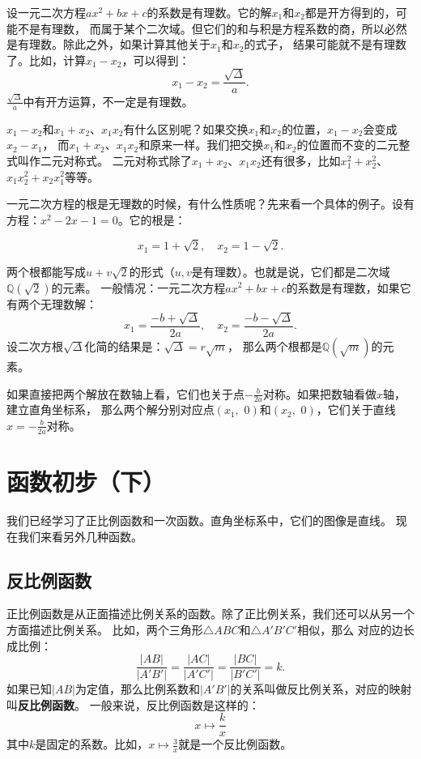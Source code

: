 \documentclass[12pt,UTF8]{ctexbook}
\begin{document}
设一元二次方程$ax^2 + bx + c$的系数是有理数。它的解$x_1$和$x_2$都是开方得到的，可能不是有理数，
而属于某个二次域。但它们的和与积是方程系数的商，所以必然是有理数。除此之外，如果计算其他关于$x_1$和$x_2$的式子，
结果可能就不是有理数了。比如，计算$x_1 - x_2$，可以得到：
$$ x_1 - x_2 = \frac{\sqrt{\Delta}}{a}. $$
$\frac{\sqrt{\Delta}}{a}$中有开方运算，不一定是有理数。

$x_1 - x_2$和$x_1 + x_2$、$x_1x_2$有什么区别呢？如果交换$x_1$和$x_2$的位置，$x_1 - x_2$会变成$x_2 - x_1$，
而$x_1 + x_2$、$x_1x_2$和原来一样。我们把交换$x_1$和$x_2$的位置而不变的二元整式叫作二元对称式。
二元对称式除了$x_1 + x_2$、$x_1x_2$还有很多，比如$x_1^2 + x_2^2$、$x_1x_2^2 + x_2x_1^2$等等。

一元二次方程的根是无理数的时候，有什么性质呢？先来看一个具体的例子。设有方程：$x^2 - 2x - 1 = 0$。它的根是：

$$ x_1 = 1 + \sqrt{2}, \quad x_2 = 1 - \sqrt{2}.$$

两个根都能写成$u + v\sqrt{2}$的形式（$u,v$是有理数）。也就是说，它们都是二次域$\mathbb{Q}(\sqrt{2})$的元素。
一般情况：一元二次方程$ax^2 + bx + c$的系数是有理数，如果它有两个无理数解：
$$x_{1} = \frac{-b + \sqrt{\Delta}}{2a},\quad x_{2} = \frac{-b - \sqrt{\Delta}}{2a}.$$
设二次方根$\sqrt{\Delta}$化简的结果是：$\sqrt{\Delta} = r\sqrt{m}$，
那么两个根都是$\mathbb{Q}(\sqrt{m})$的元素。

如果直接把两个解放在数轴上看，它们也关于点$-\frac{b}{2a}$对称。如果把数轴看做$x$轴，建立直角坐标系，
那么两个解分别对应点$(x_1, \,\,0)$和$(x_2, \,\,0)$，它们关于直线$x = -\frac{b}{2a}$对称。

\chapter{函数初步（下）}
我们已经学习了正比例函数和一次函数。直角坐标系中，它们的图像是直线。
现在我们来看另外几种函数。

\section{反比例函数}
正比例函数是从正面描述比例关系的函数。除了正比例关系，我们还可以从另一个方面描述比例关系。
比如，两个三角形$\triangle ABC$和$\triangle A'B'C'$相似，那么
对应的边长成比例：
$$ \frac{|AB|}{|A'B'|} = \frac{|AC|}{|A'C'|} = \frac{|BC|}{|B'C'|} = k.$$
如果已知$|AB|$为定值，那么比例系数和$|A'B'|$的关系叫做反比例关系，对应的映射叫\textbf{反比例函数}。
一般来说，反比例函数是这样的：
$$ x \mapsto \frac{k}{x}$$
其中$k$是固定的系数。比如，$x \mapsto \frac{3}{x}$就是一个反比例函数。
\end{document}
